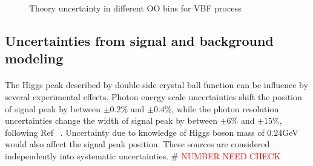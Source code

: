 \begin{figure}[htbp]
\centering
  \caption{Theory uncertainty in different OO bins for VBF process}
  \label{fig:theoryUnc_VBF}
\end{figure}




\subsection{Uncertainties from signal and background modeling}
\label{ssec:modeluncert}

\paragraph{} The Higgs peak described by double-side crystal ball function can be influence by several experimental effects. 
Photon energy scale uncertainties shift the position of signal peak by between $\pm0.2\%$ and $\pm0.4\%$, while the photon resolution uncertainties change the width of signal peak by between $\pm 6\%$ and $\pm 15\%$, following Ref ~\cite{ref:phscaleres}. 
Uncertainty due to knowledge of Higgs boson mass of 0.24GeV ~\cite{ref:mHerror} would also affect the signal peak position. 
These sources are considered independently into systematic uncertainties. 
\# \textcolor{red}{NUMBER NEED CHECK}

